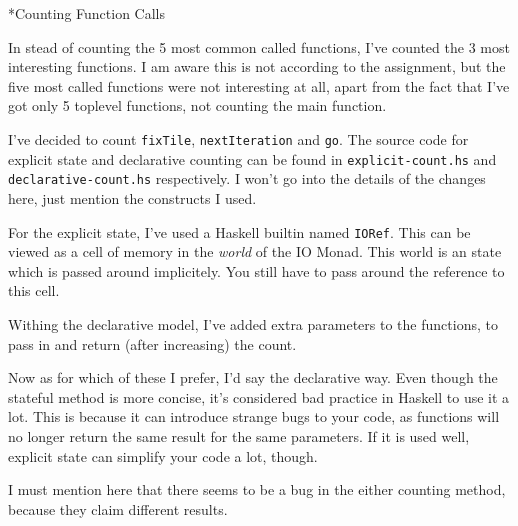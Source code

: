 \documentclass[a4paper,12pt]{article}
\begin{document}
\begin{section}
\begin{subsection}
\begin{subsubsection}
        \end{subsubsection}

    \end{subsection}



    \begin{subsection}*{Counting Function Calls}

        In stead of counting the 5 most common called functions, I've counted
        the 3 most interesting functions. I am aware this is not according to
        the assignment, but the five most called functions were not interesting
        at all, apart from the fact that I've got only 5 toplevel functions, not
        counting the main function.

        I've decided to count \texttt{fixTile}, \texttt{nextIteration} and
        \texttt{go}. The source code for explicit state and declarative counting
        can be found in \texttt{explicit-count.hs} and
        \texttt{declarative-count.hs} respectively. I won't go into the details
        of the changes here, just mention the constructs I used.

        For the explicit state, I've used a Haskell builtin named
        \texttt{IORef}. This can be viewed as a cell of memory in the
        \textit{world} of the IO Monad. This world is an state which is passed
        around implicitely. You still have to pass around the reference to this
        cell.

        Withing the declarative model, I've added extra parameters to the
        functions, to pass in and return (after increasing) the count.

        Now as for which of these I prefer, I'd say the declarative way. Even
        though the stateful method is more concise, it's considered bad practice
        in Haskell to use it a lot. This is because it can introduce strange
        bugs to your code, as functions will no longer return the same result
        for the same parameters. If it is used well, explicit state can simplify
        your code a lot, though.

        I must mention here that there seems to be a bug in the either counting
        method, because they claim different results.

    \end{subsection}


\end{section}
\end{document}
